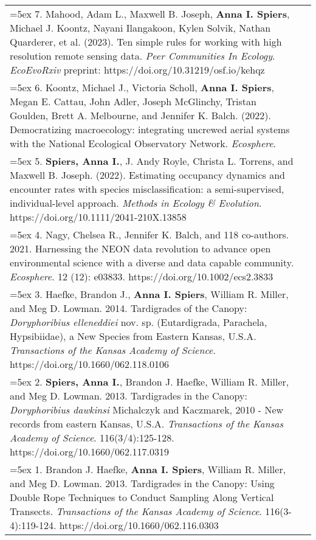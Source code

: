 \begin{longtable}{@{} >{\raggedright}p{6.10in} >{\raggedleft}X @{}}

\hangindent=5ex 7. Mahood, Adam L., Maxwell B. Joseph, \textbf{Anna I. Spiers}, Michael J. Koontz, Nayani Ilangakoon, Kylen Solvik, Nathan Quarderer, et al. (2023). Ten simple rules for working with high resolution remote sensing data. \emph{Peer Communities In Ecology}.
\newline \emph{EcoEvoRxiv} preprint: https://doi.org/10.31219/osf.io/kehqz & \tabularnewline

\hangindent=5ex 6. Koontz, Michael J., Victoria Scholl, \textbf{Anna I. Spiers}, Megan E. Cattau, John Adler, Joseph McGlinchy, Tristan Goulden, Brett A. Melbourne, and Jennifer K. Balch. (2022). Democratizing macroecology: integrating uncrewed aerial systems with the National Ecological Observatory Network. \emph{Ecosphere}.  &  \tabularnewline

\hangindent=5ex 5. \textbf{Spiers, Anna I.}, J. Andy Royle, Christa L. Torrens, and Maxwell B. Joseph. (2022). Estimating occupancy dynamics and encounter rates with species misclassification: a semi-supervised, individual-level approach. \emph{Methods in Ecology \& Evolution}. https://doi.org/10.1111/2041-210X.13858  &  \tabularnewline

\hangindent=5ex 4. Nagy, Chelsea R., Jennifer K. Balch, and 118 co-authors. 2021. Harnessing the NEON data revolution to advance open environmental science with a diverse and data capable community. \emph{Ecosphere}. 12 (12): e03833. https://doi.org/10.1002/ecs2.3833  &  \tabularnewline

\hangindent=5ex 3. Haefke, Brandon J., \textbf{Anna I. Spiers}, William R. Miller, and Meg D. Lowman. 2014. Tardigrades of the Canopy: \emph{Doryphoribius elleneddiei} nov. sp. (Eutardigrada, Parachela, Hypsibiidae), a New Species from Eastern Kansas, U.S.A. \emph{Transactions of the Kansas Academy of Science}. https://doi.org/10.1660/062.118.0106  &  \tabularnewline

\hangindent=5ex 2. \textbf{Spiers, Anna I.}, Brandon J. Haefke, William R. Miller, and Meg D. Lowman. 2013. Tardigrades in the Canopy: \emph{Doryphoribius dawkinsi} Michalczyk and Kaczmarek, 2010 - New records from eastern Kansas, U.S.A. \emph{Transactions of the Kansas Academy of Science}. 116(3/4):125-128. https://doi.org/10.1660/062.117.0319  &  \tabularnewline

\hangindent=5ex 1. Brandon J. Haefke, \textbf{Anna I. Spiers}, William R. Miller, and Meg D. Lowman. 2013. Tardigrades in the Canopy: Using Double Rope Techniques to Conduct Sampling Along Vertical Transects. \emph{Transactions of the Kansas Academy of Science}. 116(3-4):119-124. https://doi.org/10.1660/062.116.0303  &  \tabularnewline

\end{longtable}
